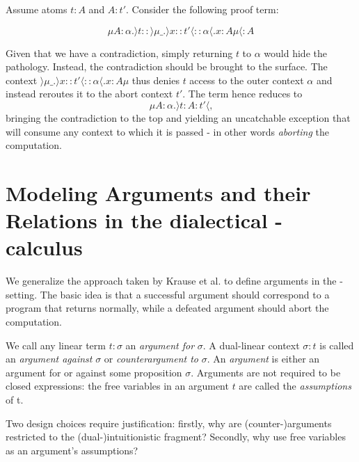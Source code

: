 \documentclass{IOS-Book-Article}
\begin{document}
\begin{example}\label{ex:control-flow:-affine-1}
  Assume atoms $t:A$ and $A:t'$. Consider the following proof term:

  \[\mu A:\alpha.\rangle t:: \rangle \mu\_.\rangle x:: t' \langle:: \alpha\langle.x:A\mu\langle:A\]

  Given that we have a contradiction, simply returning $t$ to $\alpha$ would hide the pathology. Instead, the contradiction should be brought to the surface. The context $ \rangle \mu\_.\rangle x:: t' \langle:: \alpha\langle.x:A\mu$ thus denies $t$ access to the outer context $\alpha$ and instead reroutes it to the abort context $t'$. The term hence reduces to
  $$ \mu A:\alpha.\rangle t:A:t'\langle \text{,}$$ bringing the contradiction to the top and yielding an uncatchable exception that will consume any context to which it is passed - in other words \emph{aborting} the computation.
  
\end{example}

\section{Modeling Arguments and their Relations in the dialectical \matilda-calculus}\label{sec:modell-argum-relat}

We generalize the approach taken by Krause et al. \cite{KrauseAmblerElvangGoranssonFox1995} to define arguments in the \matilda-setting.
The basic idea is that a successful argument should correspond to a program that returns normally, while a defeated argument should abort the computation.

\begin{definition}[Arguments]
  We call any linear term $t:\sigma$ an \emph{argument for} $\sigma$. A dual-linear context $\sigma:t$ is called an \emph{argument against} $\sigma$ or \emph{counterargument to} $\sigma$. An \emph{argument} is either an argument for or against some proposition $\sigma$. Arguments are not required to be closed expressions: the free variables in an argument $t$ are called the \emph{assumptions} of t.
\end{definition}

 Two design choices require justification: firstly, why are (counter-)arguments restricted to the (dual-)intuitionistic fragment? Secondly, why use free variables as an argument's assumptions?
\end{document}
